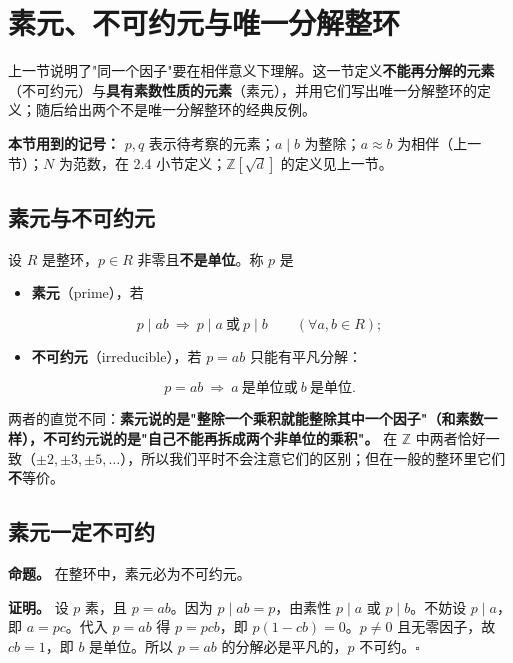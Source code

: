 \section{素元、不可约元与唯一分解整环}


上一节说明了"同一个因子"要在相伴意义下理解。这一节定义\textbf{不能再分解的元素}（不可约元）与\textbf{具有素数性质的元素}（素元），并用它们写出唯一分解整环的定义；随后给出两个不是唯一分解整环的经典反例。

\textbf{本节用到的记号：} $p,q$ 表示待考察的元素；$a\mid b$ 为整除；$a\approx b$ 为相伴（上一节）；$N$ 为范数，在 2.4 小节定义；$\mathbb Z[\sqrt{d}]$ 的定义见上一节。

\subsection{素元与不可约元}


设 $R$ 是整环，$p\in R$ 非零且\textbf{不是单位}。称 $p$ 是

\begin{itemize}
\item \textbf{素元}（prime），若
\end{itemize}

\[
  p\mid ab\ \Longrightarrow\ p\mid a\ \text{或}\ p\mid b\qquad(\forall a,b\in R);
\]
\begin{itemize}
\item \textbf{不可约元}（irreducible），若 $p=ab$ 只能有平凡分解：
\end{itemize}

\[
  p=ab\ \Longrightarrow\ a\ \text{是单位或}\ b\ \text{是单位}.
\]

两者的直觉不同：\textbf{素元说的是"整除一个乘积就能整除其中一个因子"（和素数一样），不可约元说的是"自己不能再拆成两个非单位的乘积"。} 在 $\mathbb Z$ 中两者恰好一致（$\pm2,\pm3,\pm5,\dots$），所以我们平时不会注意它们的区别；但在一般的整环里它们\textbf{不}等价。

\subsection{素元一定不可约}


\textbf{命题。} 在整环中，素元必为不可约元。

\textbf{证明。} 设 $p$ 素，且 $p=ab$。因为 $p\mid ab=p$，由素性 $p\mid a$ 或 $p\mid b$。不妨设 $p\mid a$，即 $a=pc$。代入 $p=ab$ 得 $p=pcb$，即 $p(1-cb)=0$。$p\ne0$ 且无零因子，故 $cb=1$，即 $b$ 是单位。所以 $p=ab$ 的分解必是平凡的，$p$ 不可约。$\square$

